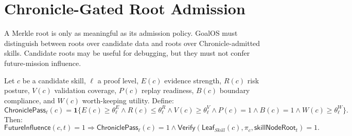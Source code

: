 \documentclass[11pt,letterpaper]{article}
\newcommand{\Leaf}{\mathsf{Leaf}}
\newcommand{\ChroniclePass}{\mathsf{ChroniclePass}}
\newcommand{\Verify}{\mathsf{Verify}}
\newcommand{\SkillRoot}{\mathsf{skillNodeRoot}}
\begin{document}
\section{Chronicle-Gated Root Admission}
A Merkle root is only as meaningful as its admission policy. GoalOS must distinguish between roots over candidate data and roots over Chronicle-admitted skills. Candidate roots may be useful for debugging, but they must not confer future-mission influence.

Let $c$ be a candidate skill, $\ell$ a proof level, $E(c)$ evidence strength, $R(c)$ risk posture, $V(c)$ validation coverage, $P(c)$ replay readiness, $B(c)$ boundary compliance, and $W(c)$ worth-keeping utility. Define:
\begin{equation}
\ChroniclePass_\ell(c)=\mathbf{1}\{E(c)\ge \theta^E_\ell \land R(c)\le \theta^R_\ell \land V(c)\ge\theta^V_\ell \land P(c)=1 \land B(c)=1 \land W(c)\ge\theta^W_\ell\}.\label{eq:chroniclepass}
\end{equation}
Then:
\begin{equation}
\mathsf{FutureInfluence}(c,t)=1 \Rightarrow \ChroniclePass_\ell(c)=1 \land \Verify(\Leaf_{Skill}(c),\pi_c,\SkillRoot_t)=1.\label{eq:influence}
\end{equation}
\end{document}
